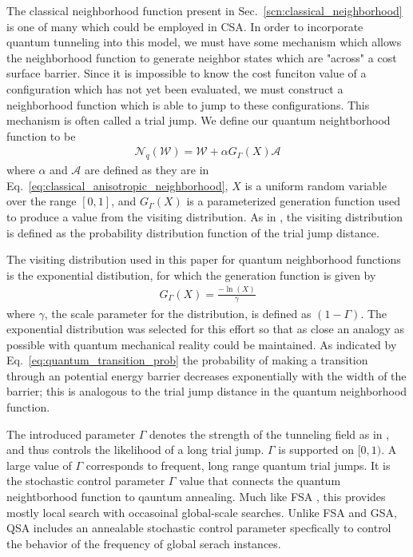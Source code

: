\documentclass[10pt,journal,cspaper,compsoc]{IEEEtran}
\begin{document}
The classical neighborhood function present in Sec.~\ref{scn:classical_neighborhood} is one of many which could be employed in CSA. In order to incorporate quantum tunneling into this model, we must have some mechanism which allows the neighborhood function to generate neighbor states which are "across" a cost surface barrier. Since it is impossible to know the cost funciton value of a configuration which has not yet been evaluated, we must construct a neighborhood function which is able to jump to these configurations. This mechanism is often called a trial jump. We define our quantum neightborhood function to be
\begin{align}\label{eq:quantum_anisotropic_neighborhood}
\mathcal{N}_{q} (\boldsymbol{\mathcal{W}}) = \boldsymbol{\mathcal{W}} + \alpha G_{\Gamma}(X) \boldsymbol{\mathcal{A}} 
\end{align}
\noindent where $\alpha$ and $\boldsymbol{\mathcal{A}}$ are defined as they are in Eq.~\ref{eq:classical_anisotropic_neighborhood}, $X$ is a uniform random variable over the range $[0,1]$, and $G_{\Gamma}(X)$ is a parameterized generation function used to produce a value from the visiting distribution. As in \cite{tsallis1996generalizedsimulatedannealing}, the visiting distribution is defined as the probability distribution function of the trial jump distance. 

The visiting distribution used in this paper for quantum neighborhood functions is the exponential distibution, for which the generation function is given by
\begin{align}\label{eq:exp_generation_fcn}
G_{\Gamma}(X) =  \frac{-\ln(X)}{\gamma}
\end{align}
\noindent where $\gamma$, the scale parameter for the distribution, is defined as $(1-\Gamma)$. The exponential distribution was selected for this effort so that as close an analogy as possible with quantum mechanical reality could be maintained. As indicated by  Eq.~\ref{eq:quantum_transition_prob} the probability of making a transition through an potential energy barrier decreases exponentially with the width of the barrier; this is analogous to the trial jump distance in the quantum neighborhood function.

The introduced parameter $\Gamma$ denotes the strength of the tunneling field as in \cite{mukherjee2015multivariatesearchqa}, and thus controls the likelihood of a long trial jump. $\Gamma$ is supported on $[0,1)$. A large value of $\Gamma$ corresponds to frequent, long range quantum trial jumps. It is the stochastic control parameter $\Gamma$ value that connects the quantum neightborhood function to qauntum annealing. Much like FSA \cite{szu1987fastsimulatedannealing}, this provides mostly local search with occasoinal global-scale searches. Unlike FSA and GSA, QSA includes an annealable stochastic control parameter specfically to control the behavior of the frequency of global serach instances.
\end{document}
